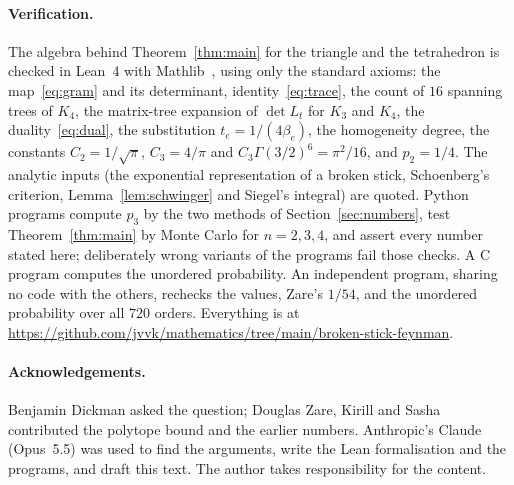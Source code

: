 \documentclass[11pt]{article}
\theoremstyle{remark}
\begin{document}
\paragraph{Verification.} The algebra behind Theorem~\ref{thm:main} for the triangle and the tetrahedron
is checked in Lean~4 with Mathlib~\cite{mathlib}, using only the standard axioms: the map~\eqref{eq:gram}
and its determinant, identity~\eqref{eq:trace}, the count of $16$ spanning trees of $K_4$, the matrix-tree
expansion of $\det L_t$ for $K_3$ and $K_4$, the duality~\eqref{eq:dual}, the substitution
$t_e=1/(4\beta_e)$, the homogeneity degree, the constants $C_2=1/\sqrt\pi$, $C_3=4/\pi$ and
$C_3\Gamma(3/2)^6=\pi^2/16$, and $p_2=1/4$. The analytic inputs (the exponential representation of a broken
stick, Schoenberg's criterion, Lemma~\ref{lem:schwinger} and Siegel's integral) are quoted. Python programs
compute $p_3$ by the two methods of Section~\ref{sec:numbers}, test Theorem~\ref{thm:main} by Monte Carlo for
$n=2,3,4$, and assert every number stated here; deliberately wrong variants of the programs fail those
checks. A C program computes the unordered probability. An independent program, sharing no code with the
others, rechecks the values, Zare's $1/54$, and the unordered probability over all $720$ orders.
Everything is at \url{https://github.com/jvvk/mathematics/tree/main/broken-stick-feynman}.

\paragraph{Acknowledgements.} Benjamin Dickman asked the question; Douglas Zare, Kirill and Sasha
contributed the polytope bound and the earlier numbers. Anthropic's Claude (Opus~5.5) was used to find the
arguments, write the Lean formalisation and the programs, and draft this text. The author takes
responsibility for the content.
\end{document}
